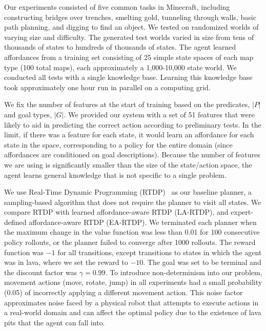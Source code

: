 \documentclass[letterpaper]{article}
\begin{document}
Our experiments consisted of five common tasks in Minecraft, including
constructing bridges over trenches, smelting gold, tunneling through
walls, basic path planning, and digging to find an object.  We tested
on randomized worlds of varying size and difficulty. The generated
test worlds varied in size from tens of thousands of states to
hundreds of thousands of states.  The agent learned affordances from a
training set consisting of 25 simple state spaces of each map type
(100 total maps), each approximately a 1,000-10,000 state world. We
conducted all tests with a single knowledge base. Learning this knowledge base
took approximately one hour run in parallel on a computing grid. 


We fix the number of features at the start of training based on the
predicates, $|P|$ and goal types, $|G|$. We provided our system with a set of 51
features that were likely to aid in predicting the correct action according to preliminary tests.
In the limit, if there was a feature for each state, it
would learn an affordance for each state in the space, corresponding
to a policy for the entire domain (since affordances are conditioned
on goal descriptions).  Because the number of features we are using is
significantly smaller than the size of the state/action space, the
agent learns general knowledge that is not specific to a single
problem.

We use Real-Time Dynamic Programming (RTDP)~\cite{barto95} as our
baseline planner, a sampling-based algorithm that does not require the
planner to visit all states. We compare RTDP with learned
affordance-aware RTDP (LA-RTDP), and expert-defined affordance-aware
RTDP (EA-RTDP). We terminated each planner when the maximum change in
the value function was less than 0.01 for 100 consecutive policy
rollouts, or the planner failed to converge after 1000 rollouts.  The
reward function was $-1$ for all transitions, except transitions to
states in which the agent was in lava, where we set the reward to
$-10$. The goal was set to be terminal and the discount factor was
$\gamma = 0.99$.  To introduce non-determinism into our problem,
movement actions (move, rotate, jump) in all experiments had a small
probability (0.05) of incorrectly applying a different movement
action.  This noise factor approximates noise faced by a physical
robot that attempts to execute actions in a real-world domain and
can affect the optimal policy due to the existence of lava pits
that the agent can fall into. 
\end{document}

